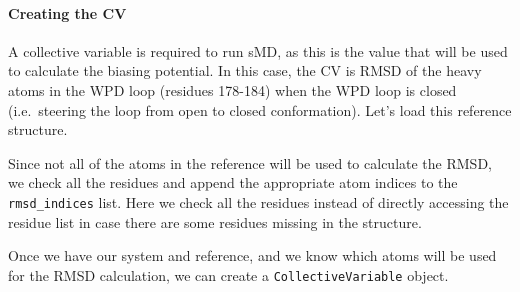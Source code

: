 \hypertarget{creating-the-cv}{%
\paragraph{Creating the CV}\label{creating-the-cv}}

A collective variable is required to run sMD, as this is the value that
will be used to calculate the biasing potential. In this case, the CV is
RMSD of the heavy atoms in the WPD loop (residues 178-184) when the WPD
loop is closed (i.e.~steering the loop from open to closed
conformation). Let's load this reference structure.

\begin{Shaded}
\begin{Highlighting}[]
\OperatorTok{=}\NormalTok{)}
\end{Highlighting}
\end{Shaded}

Since not all of the atoms in the reference will be used to calculate
the RMSD, we check all the residues and append the appropriate atom
indices to the \texttt{rmsd\_indices} list. Here we check all the
residues instead of directly accessing the residue list in case there
are some residues missing in the structure.

\begin{Shaded}
\begin{Highlighting}[]
\OperatorTok{=}\NormalTok{ []}
     \OperatorTok{<=}\OperatorTok{<=}\NormalTok{:}
            \OperatorTok{!=}\NormalTok{:}
\end{Highlighting}
\end{Shaded}

Once we have our system and reference, and we know which atoms will be
used for the RMSD calculation, we can create a
\texttt{CollectiveVariable} object.

\begin{Shaded}
\begin{Highlighting}[]
\OperatorTok{=}
\end{Highlighting}
\end{Shaded}

